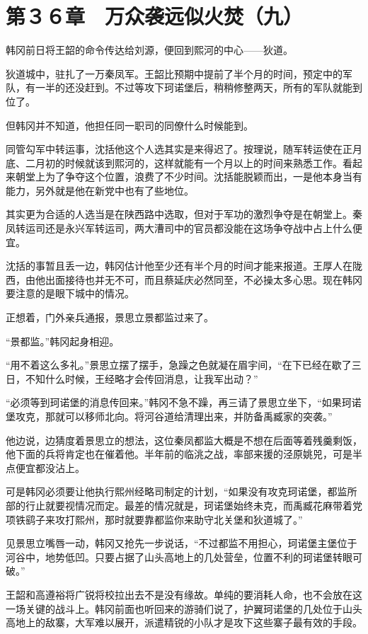 \section{第３６章　万众袭远似火焚（九）}

韩冈前日将王韶的命令传达给刘源，便回到熙河的中心——狄道。

狄道城中，驻扎了一万秦凤军。王韶比预期中提前了半个月的时间，预定中的军队，有一半的还没赶到。不过等攻下珂诺堡后，稍稍修整两天，所有的军队就能到位了。

但韩冈并不知道，他担任同一职司的同僚什么时候能到。

同管勾军中转运事，沈括他这个人选其实是来得迟了。按理说，随军转运使在正月底、二月初的时候就该到熙河的，这样就能有一个月以上的时间来熟悉工作。看起来朝堂上为了争夺这个位置，浪费了不少时间。沈括能脱颖而出，一是他本身当有能力，另外就是他在新党中也有了些地位。

其实更为合适的人选当是在陕西路中选取，但对于军功的激烈争夺是在朝堂上。秦凤转运司还是永兴军转运司，两大漕司中的官员都没能在这场争夺战中占上什么便宜。

沈括的事暂且丢一边，韩冈估计他至少还有半个月的时间才能来报道。王厚人在陇西，由他出面接待也并无不可，而且蔡延庆必然同至，不必操太多心思。现在韩冈要注意的是眼下城中的情况。

正想着，门外亲兵通报，景思立景都监过来了。

“景都监。”韩冈起身相迎。

“用不着这么多礼。”景思立摆了摆手，急躁之色就凝在眉宇间，“在下已经在歇了三日，不知什么时候，王经略才会传回消息，让我军出动？”

“必须等到珂诺堡的消息传回来。”韩冈不急不躁，再三请了景思立坐下，“如果珂诺堡攻克，那就可以移师北向。将河谷道给清理出来，并防备禹臧家的突袭。”

他边说，边猜度着景思立的想法，这位秦凤都监大概是不想在后面等着残羹剩饭，他下面的兵将肯定也在催着他。半年前的临洮之战，率部来援的泾原姚兕，可是半点便宜都没沾上。

可是韩冈必须要让他执行熙州经略司制定的计划，“如果没有攻克珂诺堡，都监所部的行止就要视情况而定。最差的情况就是，珂诺堡始终未克，而禹臧花麻带着党项铁鹞子来攻打熙州，那时就要靠都监你来助守北关堡和狄道城了。”

见景思立嘴唇一动，韩冈又抢先一步说话，“不过都监不用担心，珂诺堡主堡位于河谷中，地势低凹。只要占据了山头高地上的几处营垒，位置不利的珂诺堡转眼可破。”

王韶和高遵裕将广锐将校拉出去不是没有缘故。单纯的要消耗人命，也不会放在这一场关键的战斗上。韩冈前面也听回来的游骑们说了，护翼珂诺堡的几处位于山头高地上的敌寨，大军难以展开，派遣精锐的小队才是攻下这些寨子最有效的手段。

